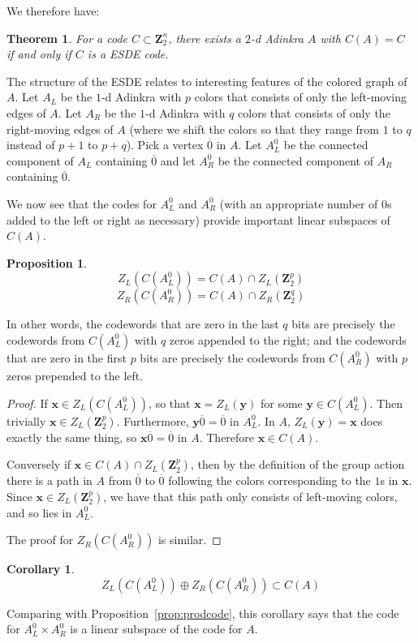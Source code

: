 \documentclass[12pt,twoside,singlespace]{article}
\numberwithin{equation}{section}
\newtheorem{thm}[equation]{Theorem}
\newtheorem{cor}[equation]{Corollary}
\newtheorem{prop}[equation]{Proposition}
\theoremstyle{definition}
\newcommand{\ZZ}{\mathbf{Z}}
\renewcommand{\vec}[1]{\mathbf{#1}}
\begin{document}
We therefore have:
\begin{thm}
\label{thm:esdeiff}
For a code $C \subset \ZZ_2^n$, there exists a $2$-d Adinkra $A$ with $C(A) = C$ if and only if $C$ is a ESDE code.
\end{thm}




The structure of the ESDE relates to interesting features of the colored graph of $A$.  Let $A_L$ be the $1$-d Adinkra with $p$ colors that consists of only the left-moving edges of $A$.  Let $A_R$ be the $1$-d Adinkra with $q$ colors that consists of only the right-moving edges of $A$ (where we shift the colors so that they range from $1$ to $q$ instead of $p+1$ to $p+q$).  Pick a vertex $\overline{0}$ in $A$.  Let $A_L^0$ be the connected component of $A_L$ containing $\overline{0}$ and let $A_R^0$ be the connected component of $A_R$ containing $\overline{0}$.

We now see that the codes for $A_L^0$ and $A_R^0$ (with an appropriate number of $0$s added to the left or right as necessary) provide important linear subspaces of $C(A)$.

\begin{prop}
\[Z_L(C(A_L^0))=C(A)\cap Z_L(\ZZ_2^p)\]
\[Z_R(C(A_R^0))=C(A)\cap Z_R(\ZZ_2^q)\]
\end{prop}
In other words, the codewords that are zero in the last $q$ bits are precisely the codewords from $C(A_L^0)$ with $q$ zeros appended to the right; and the codewords that are zero in the first $p$ bits are precisely the codewords from $C(A_R^0)$ with $p$ zeros prepended to the left.
\begin{proof}
If $\vec{x}\in Z_L(C(A_L^0))$, so that $\vec{x}=Z_L(\vec{y})$ for some $\vec{y}\in C(A_L^0)$.  Then trivially $\vec{x}\in Z_L(\ZZ_2^p)$.  Furthermore, $\vec{y}\overline{0}=\overline{0}$ in $A_L^0$.  In $A$, $Z_L(\vec{y})=\vec{x}$ does exactly the same thing, so $\vec{x}\overline{0}=\overline{0}$ in $A$.  Therefore $\vec{x}\in C(A)$.

Conversely if $\vec{x}\in C(A)\cap Z_L(\ZZ_2^p)$, then by the definition of the group action there is a path in $A$ from $\overline{0}$ to $\overline{0}$ following the colors corresponding to the $1$s in $\vec{x}$.  Since $\vec{x}\in Z_L(\ZZ_2^p)$, we have that this path only consists of left-moving colors, and so lies in $A_L^0$.

The proof for $Z_R(C(A_R^0))$ is similar.
\end{proof}

\begin{cor}
\label{cor:cplus}
\[Z_L(C(A_L^0))\oplus Z_R(C(A_R^0))\subset C(A)\]
\end{cor}
Comparing with Proposition~\ref{prop:prodcode}, this corollary says that the code for $A_L^0\times A_R^0$ is a linear subspace of the code for $A$.
\end{document}
